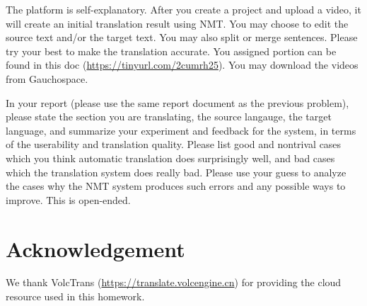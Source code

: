 \documentclass[12pt,letterpaper]{article}
\begin{document}
The platform is self-explanatory. After you create a project and upload a video, it will create an initial translation result using NMT. You may choose to edit the source text and/or the target text. You may also split or merge sentences. 
Please try your best to make the translation accurate. You assigned portion can be found in this doc (\url{https://tinyurl.com/2cumrh25}). You may download the videos from Gauchospace. 

In your report (please use the same report document as the previous problem), please state the section you are translating, the source langauge, the target language, and summarize your experiment and feedback for the system, in terms of the userability and translation quality. Please list good and nontrival cases which you think automatic translation does surprisingly well, and bad cases which the translation system does really bad. 
Please use your guess to analyze the cases why the NMT system produces such errors and any possible ways to improve. This is open-ended. 

\section*{Acknowledgement}
We thank VolcTrans (\url{https://translate.volcengine.cn}) for providing the cloud resource used in this homework. 
\end{document}
